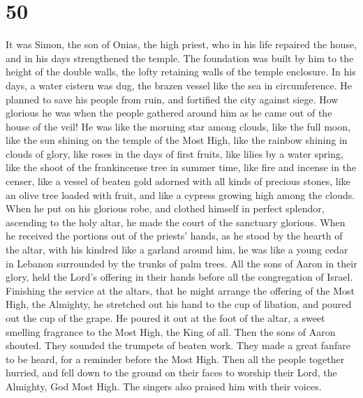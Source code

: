 \hypertarget{section-35}{%
\section{50}\label{section-35}}

 It was Simon, the son of Onias, the high priest, who in
his life repaired the house, and in his days strengthened the temple.
 The foundation was built by him to the height of the
double walls, the lofty retaining walls of the temple enclosure.
 In his days, a water cistern was dug, the brazen vessel
like the sea in circumference.  He planned to save his
people from ruin, and fortified the city against siege. 
How glorious he was when the people gathered around him as he came out
of the house of the veil!  He was like the morning star
among clouds, like the full moon,  like the sun shining on
the temple of the Most High, like the rainbow shining in clouds of
glory,  like roses in the days of first fruits, like
lilies by a water spring, like the shoot of the frankincense tree in
summer time,  like fire and incense in the censer, like a
vessel of beaten gold adorned with all kinds of precious stones,
 like an olive tree loaded with fruit, and like a cypress
growing high among the clouds.  When he put on his
glorious robe, and clothed himself in perfect splendor, ascending to the
holy altar, he made the court of the sanctuary glorious. 
When he received the portions out of the priests' hands, as he stood by
the hearth of the altar, with his kindred like a garland around him, he
was like a young cedar in Lebanon surrounded by the trunks of palm
trees.  All the sons of Aaron in their glory, held the
Lord's offering in their hands before all the congregation of Israel.
 Finishing the service at the altars, that he might
arrange the offering of the Most High, the Almighty,  he
stretched out his hand to the cup of libation, and poured out the cup of
the grape. He poured it out at the foot of the altar, a sweet smelling
fragrance to the Most High, the King of all.  Then the
sons of Aaron shouted. They sounded the trumpets of beaten work. They
made a great fanfare to be heard, for a reminder before the Most High.
 Then all the people together hurried, and fell down to
the ground on their faces to worship their Lord, the Almighty, God Most
High.  The singers also praised him with their voices.
